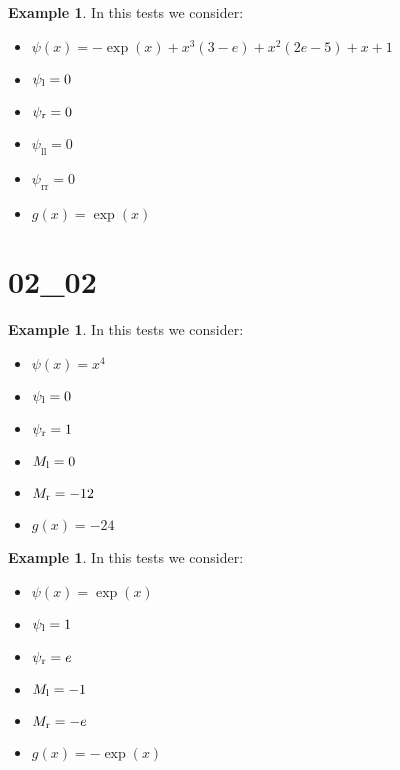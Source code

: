 \documentclass[11pt,a4paper]{article}
\theoremstyle{plain}
\theoremstyle{definition}
\newtheorem{exmp}[thm]{Example} %
\begin{document}
\begin{exmp}
\label{Example:PRO:bending:01_01_glob2v2}
In this tests we consider:
\begin{itemize}
\item $\psi(x)=-\exp(x)+x^3(3-e)+x^2(2e-5)+x+1$
\item $\psi_\text l=0$
\item $\psi_\text r=0$
\item $\psi_\text{ll}=0$
\item $\psi_\text{rr}=0$
\item $g(x)=\exp(x)$
\end{itemize}
\end{exmp}



\pagebreak

\section{02\_02}

\begin{exmp}
\label{Example:PRO:bending:02_02_glob3v2}
In this tests we consider:
\begin{itemize}
\item $\psi(x)=x^4$
\item $\psi_\text l=0$
\item $\psi_\text r=1$
\item $M_\text l=0$
\item $M_\text r=-12$
\item $g(x)=-24$
\end{itemize}
\end{exmp}
%
%
%
\pagebreak

\begin{exmp}
\label{Example:PRO:bending:02_02_glob6v2}
In this tests we consider:
\begin{itemize}
\item $\psi(x)=\exp(x)$
\item $\psi_\text l=1$
\item $\psi_\text r=e$
\item $M_\text l=-1$
\item $M_\text r=-e$
\item $g(x)=-\exp(x)$
\end{itemize}
\end{exmp}
%
%
%
\pagebreak
\end{document}
